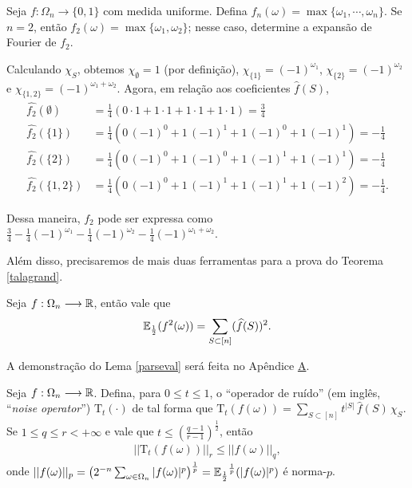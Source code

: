 \begin{myexp}
	Seja $f:\Omega_n\longrightarrow\{0,1\}$ com medida uniforme. Defina $f_n(\omega) = \max\{\omega_1, \cdots, \omega_n\}$. Se $n = 2$, então $f_2(\omega) = \max\{\omega_1, \omega_2\}$; nesse caso, determine a expansão de Fourier de $f_2$.
	\par Calculando $\chi_S$, obtemos $\chi_\emptyset = 1$ (por definição), $\chi_{\{1\}} = (-1)^{\omega_1}$, $\chi_{\{2\}} = (-1)^{\omega_2}$ e $\chi_{\{1,2\}} = (-1)^{\omega_1 + \omega_2}$. Agora, em relação aos coeficientes $\widehat{f}(S)$, \vspace{-2pt}
	\begin{align*}
		\widehat{f_2}(\emptyset) & = \frac{1}{4} \left(0 \cdot 1 + 1 \cdot 1 + 1 \cdot 1 + 1 \cdot 1\right) = \frac{3}{4} \\
		\widehat{f_2}(\{1\})     & = \frac{1}{4} \left(0\,(-1)^0 + 1\,(-1)^1 + 1\,(-1)^0 + 1\,(-1)^1 \right) = -\frac{1}{4} \\
		\widehat{f_2}(\{2\})     & = \frac{1}{4} \left(0\,(-1)^0 + 1\,(-1)^0 + 1\,(-1)^1 + 1\,(-1)^1 \right) = -\frac{1}{4} \\
		\widehat{f_2}(\{1, 2\})  & = \frac{1}{4} \left(0\,(-1)^0 + 1\,(-1)^1 + 1\,(-1)^1 + 1\,(-1)^2 \right) = -\frac{1}{4}. 
	\end{align*}
	\par Dessa maneira, $f_2$ pode ser expressa como $\frac{3}{4} - \frac{1}{4}(-1)^{\omega_1} - \frac{1}{4}(-1)^{\omega_2} - \frac{1}{4}(-1)^{\omega_1 + \omega_2}$.
\end{myexp}

\par Além disso, precisaremos de mais duas ferramentas para a prova do Teorema \ref{talagrand}.

\begin{mylem} \label{parseval}
	Seja $f: \Omega_n \longrightarrow \operatorname{\mathbb{R}}$, então vale que
	\begin{align*}
		\operatorname{\mathbb{E}}_{\frac{1}{2}}(f^2(\omega)) = \sum_{S \subset [n]} (\widehat{f}(S))^2.
	\end{align*}
\end{mylem}

\par A demonstração do Lema \ref{parseval} será feita no Apêndice \hyperref[apendice-primeiro]{A}.

\begin{mylem} \label{bonami-beckner}
	Seja $f: \Omega_n \longrightarrow \operatorname{\mathbb{R}}$. Defina, para $0 \leq t \leq 1$,  o ``operador de ruído'' (em inglês, ``\textit{noise operator}'') $\text{T}_t(\cdot)$ de tal forma que $\text{T}_t(f(\omega)) = \sum_{S \subset [n]} t^{|S|} \, \widehat{f}(S) \, \chi_S$. Se $1 \leq q \leq r < + \infty$ e vale que $t \leq \left(\frac{q - 1}{r - 1}\right)^{\frac{1}{2}}$, então
	\begin{align*}
	||\text{T}_t(f(\omega))||_r \leq ||f(\omega)||_q, 
	\end{align*}
	onde $||f(\omega)||_p = \left(2^{-n}\sum_{\omega \in \Omega_n} |f(\omega)|^p\right)^{\frac{1}{p}} =  {\operatorname{\mathbb{E}}_{\frac{1}{2}}}^{\frac{1}{p}}(|f(\omega)|^{p})$ é norma-$p$.
\end{mylem}

